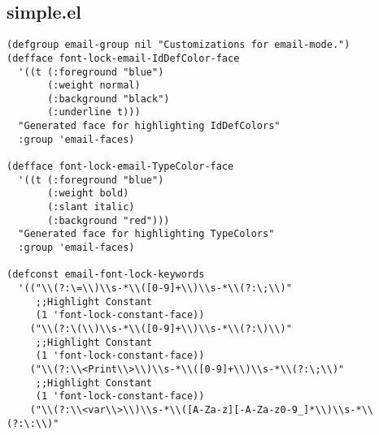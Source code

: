 \documentclass[]{article}
\begin{document}
  \subsection{simple.el}
  \lstset{language=Lisp}
  \begin{lstlisting}
(defgroup email-group nil "Customizations for email-mode.")
(defface font-lock-email-IdDefColor-face
  '((t (:foreground "blue")
       (:weight normal)
       (:background "black")
       (:underline t)))
  "Generated face for highlighting IdDefColors"
  :group 'email-faces)

(defface font-lock-email-TypeColor-face
  '((t (:foreground "blue")
       (:weight bold)
       (:slant italic)
       (:background "red")))
  "Generated face for highlighting TypeColors"
  :group 'email-faces)

(defconst email-font-lock-keywords
  '(("\\(?:\=\\)\\s-*\\([0-9]+\\)\\s-*\\(?:\;\\)"
     ;;Highlight Constant
     (1 'font-lock-constant-face))
    ("\\(?:\(\\)\\s-*\\([0-9]+\\)\\s-*\\(?:\)\\)"
     ;;Highlight Constant
     (1 'font-lock-constant-face))
    ("\\(?:\\<Print\\>\\)\\s-*\\([0-9]+\\)\\s-*\\(?:\;\\)"
     ;;Highlight Constant
     (1 'font-lock-constant-face))
    ("\\(?:\\<var\\>\\)\\s-*\\([A-Za-z][-A-Za-z0-9_]*\\)\\s-*\\(?:\:\\)"

\end{lstlisting}
\end{document}
